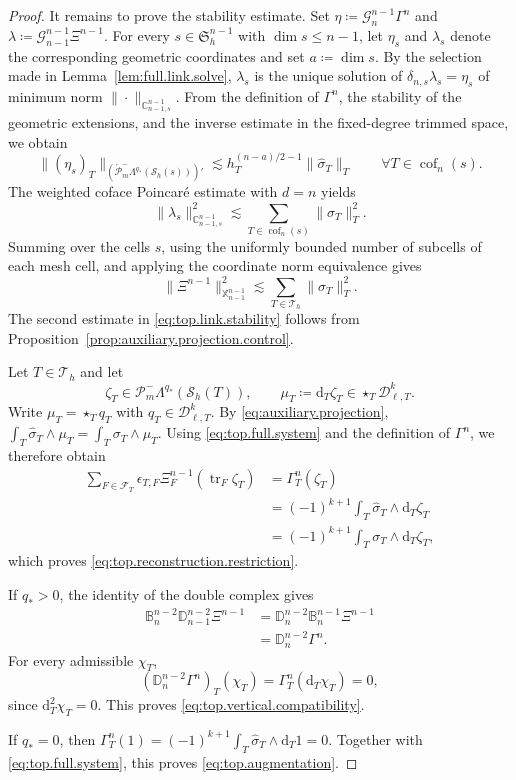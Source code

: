 \documentclass[a4paper,11pt]{article}
\theoremstyle{definition}
\newcommand{\DIFF}{\mathrm{d}}
\newcommand{\Sh}{\mathcal{S}_h}
\newcommand{\cof}[1]{\operatorname{cof}_{#1}}
\newcommand{\PLtrim}[2]{\mathcal{P}_{#1}^{-}\Lambda^{#2}}
\newcommand{\Dpoly}[2]{\mathcal D_{\ell,#1}^{#2}}
\newcommand{\trc}{\operatorname{tr}}
\newcommand{\epsTF}{\epsilon_{T,F}}
\newcommand{\PLtrimz}[2]{\mathring{\mathcal P}_{#1}^{-}\Lambda^{#2}}
\begin{document}
\begin{proof}
It remains to prove the stability estimate.
Set $\eta \coloneqq \mathcal G_n^{n-1}\Gamma^n$ and $\lambda \coloneqq \mathcal G_{n-1}^{n-1}\Xi^{n-1}$.
For every $s\in\mathfrak S_h^{n-1}$ with $\dim s\leq n-1$, let $\eta_s$ and $\lambda_s$ denote the corresponding geometric coordinates and set $a\coloneqq\dim s$.
By the selection made in Lemma~\ref{lem:full.link.solve}, $\lambda_s$ is the unique solution of $\delta_{n,s}\lambda_s=\eta_s$ of minimum norm $\|\cdot\|_{\mathbb C_{n-1,s}^{n-1}}$.
From the definition of $\Gamma^n$, the stability of the geometric extensions, and the inverse estimate in the fixed-degree trimmed space, we obtain
\[
\|(\eta_s)_T\|_{
\left(
\PLtrimz{m}{q_*}(\Sh(s))
\right)'
}
\lesssim
h_T^{(n-a)/2-1}
\|\widehat\sigma_T\|_T
\qquad
\forall
T\in\cof{n}(s).
\]
The weighted coface Poincar\'e estimate with $d=n$ yields
\[
\|\lambda_s\|_{\mathbb C_{n-1,s}^{n-1}}^2
\lesssim
\sum_{T\in\cof{n}(s)}
  \|\widehat\sigma_T\|_T^2.
\]
Summing over the cells $s$, using the uniformly bounded number of subcells of each mesh cell, and applying the coordinate norm equivalence gives
\[
\|\Xi^{n-1}\|_{\mathbb X_{n-1}^{n-1}}^2
\lesssim
\sum_{T\in\mathcal T_h}
\|\widehat\sigma_T\|_T^2.
\]
The second estimate in \eqref{eq:top.link.stability} follows from Proposition~\ref{prop:auxiliary.projection.control}.

Let $T\in\mathcal T_h$ and let
\[
\zeta_T
\in
\PLtrim{m}{q_*}(\Sh(T)),
\qquad
\mu_T
\coloneqq
\DIFF_T\zeta_T
\in
\star_T\Dpoly{T}{k}.
\]
Write $\mu_T=\star_Tq_T$ with $q_T\in\Dpoly{T}{k}$.
By \eqref{eq:auxiliary.projection}, $\int_T \widehat\sigma_T\wedge\mu_T = \int_T \sigma_T\wedge\mu_T$.
Using \eqref{eq:top.full.system} and the definition of $\Gamma^n$, we therefore obtain
\[
\begin{aligned}
  \sum_{F\in\mathcal F_T}
  \epsTF
  \Xi_F^{n-1}(\trc_F\zeta_T)
  &=
  \Gamma_T^n(\zeta_T)
  \\
  &=
  (-1)^{k+1}
  \int_T
  \widehat\sigma_T\wedge\DIFF_T\zeta_T
  \\
  &=
  (-1)^{k+1}
  \int_T
  \sigma_T\wedge\DIFF_T\zeta_T,
\end{aligned}
\]
which proves \eqref{eq:top.reconstruction.restriction}.

If $q_*>0$, the identity of the double complex gives
\[
\begin{aligned}
  \mathbb B_n^{n-2}
  \mathbb D_{n-1}^{n-2}\Xi^{n-1}
  &=
  \mathbb D_n^{n-2}
  \mathbb B_n^{n-1}\Xi^{n-1}
  \\
  &=
  \mathbb D_n^{n-2}\Gamma^n.
\end{aligned}
\]
For every admissible $\chi_T$,
\[
  \left(
    \mathbb D_n^{n-2}\Gamma^n
  \right)_T(\chi_T)
  =
  \Gamma_T^n(\DIFF_T\chi_T)
  =
  0,
\]
since $\DIFF_T^2\chi_T=0$.
This proves \eqref{eq:top.vertical.compatibility}.

If $q_*=0$, then $\Gamma_T^n(1) = (-1)^{k+1} \int_T \widehat\sigma_T\wedge\DIFF_T1 = 0$.
Together with \eqref{eq:top.full.system}, this proves \eqref{eq:top.augmentation}.
\end{proof}
\end{document}

